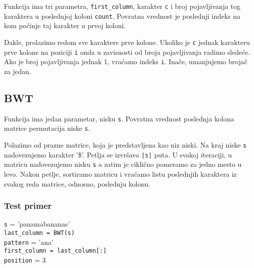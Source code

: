 Funkcija ima tri parametra, \texttt{first\_column}, karakter \texttt{c} i broj pojavljivanja tog karaktera u poslednjoj koloni \texttt{count}. Povratna vrednost je poslednji indeks na kom počinje taj karakter u prvoj koloni.

Dakle, prolazimo redom sve karaktere prve kolone. Ukoliko je \texttt{c} jednak karakteru prve kolone na poziciji \texttt{i} onda u zavisnosti od broja pojavljivanja radimo sledeće. Ako je broj pojavljivanja jednak 1, vraćamo indeks \texttt{i}. Inače, umanjujemo brojač za jedan.





\newpage 



\newpage

\subsection{BWT}
\label{BWT}

Funkcija ima jedan parametar, nisku \texttt{s}. Povratna vrednost poslednja kolona matrice permutacija niske \texttt{s}.

Polazimo od prazne matrice, koja je predstavljena kao niz niski. Na kraj niske \texttt{s} nadovezujemo karakter '\$'. Petlja se izvršava \texttt{|s|} puta. U svakoj iteraciji, u matricu nadovezujemo nisku \texttt{s} a zatim je ciklično pomeramo za jedno mesto u levo. Nakon petlje, sortiramo matricu i vraćamo listu poslednjih karaktera iz svakog reda matrice, odnosno, poslednju kolonu.

	



\subsubsection{Test primer}

\noindent\texttt{s} = 'panamabananas'
\\\texttt{last\_column = BWT(s)}
\\\texttt{pattern} = 'ana'
\\\texttt{first\_column = last\_column[:]}
\\\texttt{position} = 3 

